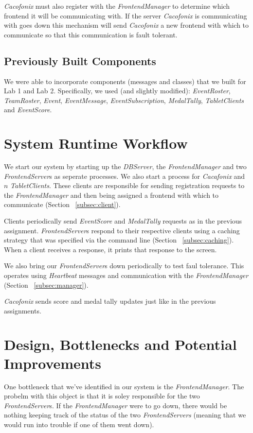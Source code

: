 \documentclass[11pt]{article}
\begin{document}
\emph{Cacofonix} must also register with the \emph{FrontendManager} to
determine which frontend it will be communicating with. If the server
\emph{Cacofonix} is communicating with goes down this mechanism will
send \emph{Cacofonix} a new frontend with which to communicate so that
this communication is fault tolerant.

\subsection{Previously Built Components}
We were able to incorporate components (messages and classes) that we
built for Lab 1 and Lab 2.  Specifically, we used (and slightly
modified): \emph{EventRoster}, \emph{TeamRoster}, \emph{Event},
\emph{EventMessage}, \emph{EventSubscription}, \emph{MedalTally},
\emph{TabletClients} and \emph{EventScore}.

\section{System Runtime Workflow}
We start our system by starting up the \emph{DBServer}, the
\emph{FrontendManager} and two \emph{FrontendServer}s as seperate
processes.  We also start a process for \emph{Cacafonix} and $n$
\emph{TabletClients}.  These clients are responsible for sending
registration requests to the \emph{FrontendManager} and then being
assigned a frontend with which to communicate (Section
~\ref{subsec:client}).

Clients periodically send \emph{EventScore} and \emph{MedalTally}
requests as in the previous assignment. \emph{FrontendServer}s respond
to their respective clients using a caching strategy that was
specified via the command line (Section ~\ref{subsec:caching}). When a
client receives a response, it prints that response to the screen.

We also bring our \emph{FrontendServer}s down periodically to test
faul tolerance. This operates using \emph{Heartbeat} messages and
communication with the \emph{FrontendManager} (Section
~\ref{subsec:manager}).

\emph{Cacofonix} sends score and medal tally updates just like in the
previous assignments.

\section{Design, Bottlenecks and Potential Improvements}
One bottleneck that we've identified in our system is the
\emph{FrontendManager}.  The probelm with this object is that it is
soley responsible for the two \emph{FrontendServer}s.  If the
\emph{FrontendManager} were to go down, there would be nothing keeping
track of the status of the two \emph{FrontendServers} (meaning that we
would run into trouble if one of them went down).
\end{document}
